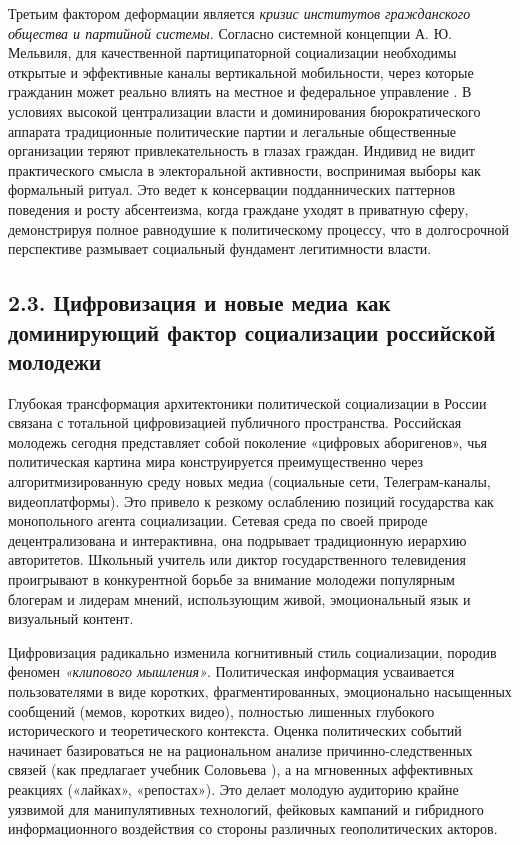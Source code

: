 Третьим фактором деформации является \textit{кризис институтов гражданского общества и партийной системы}. Согласно системной концепции А. Ю. Мельвиля, для качественной партиципаторной социализации необходимы открытые и эффективные каналы вертикальной мобильности, через которые гражданин может реально влиять на местное и федеральное управление \cite{Melville}. В условиях высокой централизации власти и доминирования бюрократического аппарата традиционные политические партии и легальные общественные организации теряют привлекательность в глазах граждан. Индивид не видит практического смысла в электоральной активности, воспринимая выборы как формальный ритуал. Это ведет к консервации подданнических паттернов поведения и росту абсентеизма, когда граждане уходят в приватную сферу, демонстрируя полное равнодушие к политическому процессу, что в долгосрочной перспективе размывает социальный фундамент легитимности власти.

\subsection{2.3. Цифровизация и новые медиа как доминирующий фактор социализации российской молодежи}

Глубокая трансформация архитектоники политической социализации в России связана с тотальной цифровизацией публичного пространства. Российская молодежь сегодня представляет собой поколение «цифровых аборигенов», чья политическая картина мира конструируется преимущественно через алгоритмизированную среду новых медиа (социальные сети, Телеграм-каналы, видеоплатформы). Это привело к резкому ослаблению позиций государства как монопольного агента социализации. Сетевая среда по своей природе децентрализована и интерактивна, она подрывает традиционную иерархию авторитетов. Школьный учитель или диктор государственного телевидения проигрывают в конкурентной борьбе за внимание молодежи популярным блогерам и лидерам мнений, использующим живой, эмоциональный язык и визуальный контент.

Цифровизация радикально изменила когнитивный стиль социализации, породив феномен \textit{«клипового мышления»}. Политическая информация усваивается пользователями в виде коротких, фрагментированных, эмоционально насыщенных сообщений (мемов, коротких видео), полностью лишенных глубокого исторического и теоретического контекста. Оценка политических событий начинает базироваться не на рациональном анализе причинно-следственных связей (как предлагает учебник Соловьева \cite{Solovyev}), а на мгновенных аффективных реакциях («лайках», «репостах»). Это делает молодую аудиторию крайне уязвимой для манипулятивных технологий, фейковых кампаний и гибридного информационного воздействия со стороны различных геополитических акторов.

